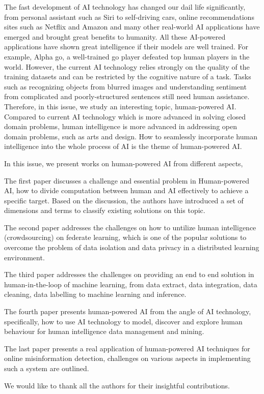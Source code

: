 \documentclass[11pt]{article}
\begin{document}
The fast development of AI technology has changed our dail life significantly,  from personal assistant such as Siri to self-driving cars, online recommendations
sites such as Netflix and Amazon and many other real-world AI applications have emerged and brought great benefits to humanity. All these AI-powered applications have shown great intelligence if their models are well trained.  For example, Alpha go, a well-trained go player defeated top human players in the world.  However, the current AI technology relies strongly on the quality of the training datasets and can be restricted by the cognitive nature of a task. Tasks such as recognizing objects from blurred images and understanding sentiment
from complicated and poorly-structured sentences still need human assistance.  Therefore, in this issue, we study an interesting topic, human-powered AI.  Compared to current AI technology which is more advanced in solving closed domain problems, human intelligence is more advanced in addressing open domain problems, such as arts and design. How to seamlessly incorporate human intelligence into the whole process of AI is the theme of human-powered AI.

In this issue, we present works on human-powered AI from different aspects, 

The first paper discusses a challenge and essential problem in Human-powered AI, how to divide computation between human and AI effectively to achieve a specific target. Based on the discussion, the authors have introduced a set of dimensions and terms to classify existing solutions on this topic. 

The second paper addresses the challenges on how to untilize human intelligence (crowdsourcing) on federate learning,  which is one of the popular solutions to overcome the problem of data isolation and data privacy in a distributed learning environment.


The third  paper addresses the challenges on providing an end to end solution in human-in-the-loop of machine learning, from data extract, data integration, data cleaning, data labelling to machine learning and inference.


The fourth  paper  presents human-powered AI from the angle of AI technology, specifically, how to use AI technology to model, discover and explore human behaviour for human intelligence data management and mining. 


The last paper presents a real application of human-powered AI  techniques for online misinformation detection, challenges on various aspects in implementing such a system are outlined.


We  would like to thank all the authors for their insightful contributions. 
\end{document}
